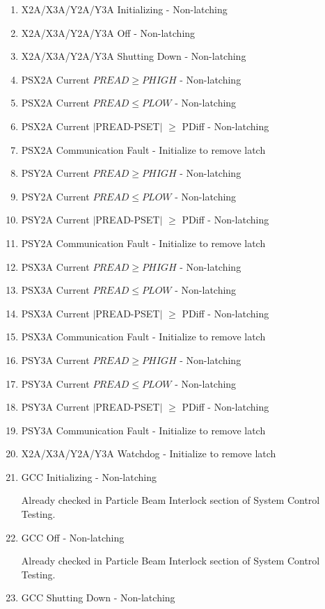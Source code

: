 \documentclass[11pt]{book}		%
\begin{document}
\begin{enumerate}
 \item X2A/X3A/Y2A/Y3A Initializing - Non-latching
 \item X2A/X3A/Y2A/Y3A Off - Non-latching
 \item X2A/X3A/Y2A/Y3A Shutting Down - Non-latching
 \item PSX2A Current $PREAD \geq PHIGH$ - Non-latching
 \item PSX2A Current $PREAD \leq PLOW$ - Non-latching
 \item PSX2A Current $\mid$PREAD-PSET$\mid$  $\geq$ PDiff - Non-latching
 \item PSX2A Communication Fault - Initialize to remove latch
 \item PSY2A Current $PREAD \geq PHIGH$ - Non-latching
 \item PSY2A Current $PREAD \leq PLOW$ - Non-latching
 \item PSY2A Current $\mid$PREAD-PSET$\mid$  $\geq$ PDiff - Non-latching
 \item PSY2A Communication Fault - Initialize to remove latch
 \item PSX3A Current $PREAD \geq PHIGH$ - Non-latching
 \item PSX3A Current $PREAD \leq PLOW$ - Non-latching
 \item PSX3A Current $\mid$PREAD-PSET$\mid$  $\geq$ PDiff - Non-latching
 \item PSX3A Communication Fault - Initialize to remove latch
 \item PSY3A Current $PREAD \geq PHIGH$ - Non-latching
 \item PSY3A Current $PREAD \leq PLOW$ - Non-latching
 \item PSY3A Current $\mid$PREAD-PSET$\mid$  $\geq$ PDiff - Non-latching
 \item PSY3A Communication Fault - Initialize to remove latch
 \item X2A/X3A/Y2A/Y3A Watchdog - Initialize to remove latch
 \item GCC Initializing - Non-latching

\color{red}
Already checked in Particle Beam Interlock section of System Control Testing.
\color{black}

 \item GCC Off - Non-latching

\color{red}
Already checked in Particle Beam Interlock section of System Control Testing.
\color{black}

 \item GCC Shutting Down - Non-latching


\end{enumerate}
\end{document}
